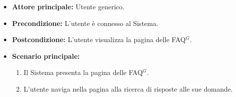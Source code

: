 
\label{usecase:Visualizzazione FAQ}
\begin{itemize}
	\item \textbf{Attore principale:} Utente generico.


	\item \textbf{Precondizione:}
	      L'utente è connesso al Sistema.

	\item \textbf{Postcondizione:} L'utente visualizza la pagina delle \ac{FAQ}$^G$.

	\item \textbf{Scenario principale:}
	      \begin{enumerate}
              \item Il Sistema presenta la pagina delle \ac{FAQ}$^G$.
              \item L'utente naviga nella pagina alla ricerca di risposte alle sue domande.
		    
	      \end{enumerate}
\end{itemize}